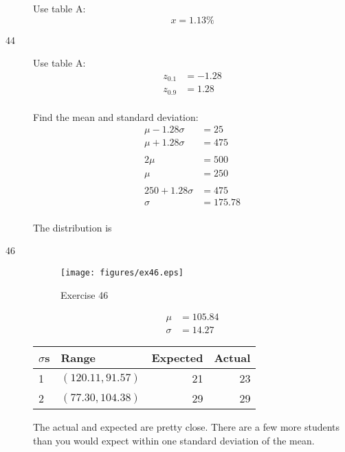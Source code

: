 \documentclass[letterpaper, landscape]{exam}
\begin{document}
\begin{description}
\begin{parts}
            Use table A: 
            \[
              x = \boxed{ 1.13 \% }
            \]

        \end{parts}

      \item[44]
        Use table A: 
        \begin{align*}
          z_{0.1} &= -1.28 \\
          z_{0.9} &= 1.28 \\
        \end{align*}

        Find the mean and standard deviation:
        \begin{align*}
          \mu - 1.28 \sigma &= 25 \\
          \mu + 1.28 \sigma &= 475 \\
          \\
          2 \mu & = 500 \\
          \mu   & = 250 \\
          \\
          250 + 1.28 \sigma & = 475 \\
          \sigma            & = 175.78 \\
        \end{align*}

        The distribution is 

      \item[46]
        \begin{figure}[H]
          \centering
          \texttt{[image: figures/ex46.eps]}
          \caption{Exercise 46}
        \end{figure}

        \begin{align*}
          \mu    & = 105.84 \\
          \sigma & = 14.27
        \end{align*}

        \begin{tabular}[H]{llrr}
          \toprule
          $\sigma$s & Range             & Expected & Actual \\
          \midrule
          1         & $(120.11, 91.57)$ & 21       & 23 \\
          2         & $(77.30, 104.38)$ & 29       & 29 \\
          \bottomrule
        \end{tabular}

        The actual and expected are pretty close.  There are a few more students than you
        would expect within one standard deviation of the mean.  


\end{description}
\end{document}
